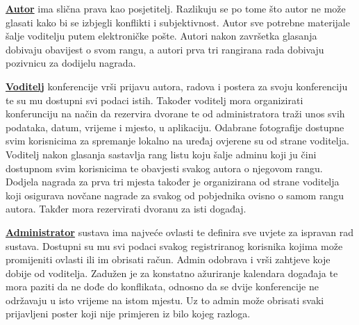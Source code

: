 		\textbf{\underline{Autor}} ima slična prava kao posjetitelj. Razlikuju se po tome što autor ne može glasati kako bi se izbjegli konflikti i subjektivnost. Autor sve potrebne materijale šalje voditelju putem elektroničke pošte. Autori nakon završetka glasanja dobivaju obavijest o svom rangu, a autori prva tri rangirana rada dobivaju pozivnicu za dodijelu nagrada.

		\textbf{\underline{Voditelj}} konferencije vrši prijavu autora, radova i postera za svoju konferenciju te su mu dostupni svi podaci istih. Također voditelj mora organizirati konferunciju na način da rezervira dvorane te od administratora traži unos svih podataka, datum, vrijeme i mjesto, u aplikaciju. Odabrane fotografije dostupne svim korisnicima za spremanje lokalno na uređaj ovjerene su od strane voditelja. Voditelj nakon glasanja sastavlja rang listu koju šalje adminu koji ju čini dostupnom svim korisnicima te obavjesti svakog autora o njegovom rangu. Dodjela nagrada za prva tri mjesta također je organizirana od strane voditelja koji osigurava novčane nagrade za svakog od pobjednika ovisno o samom rangu autora. Takđer mora rezervirati dvoranu za isti događaj.

		\textbf{\underline{Administrator}} sustava ima najveće ovlasti te definira sve uvjete za ispravan rad sustava. Dostupni su mu svi podaci svakog registriranog korisnika kojima može promijeniti ovlasti ili im obrisati račun. Admin odobrava i vrši zahtjeve koje dobije od voditelja. Zadužen je za konstatno ažuriranje kalendara događaja te mora paziti da ne dođe do konflikata, odnosno da se dvije konferencije ne održavaju u isto vrijeme na istom mjestu. Uz to admin može obrisati svaki prijavljeni poster koji nije primjeren iz bilo kojeg razloga.

		

				

		
	